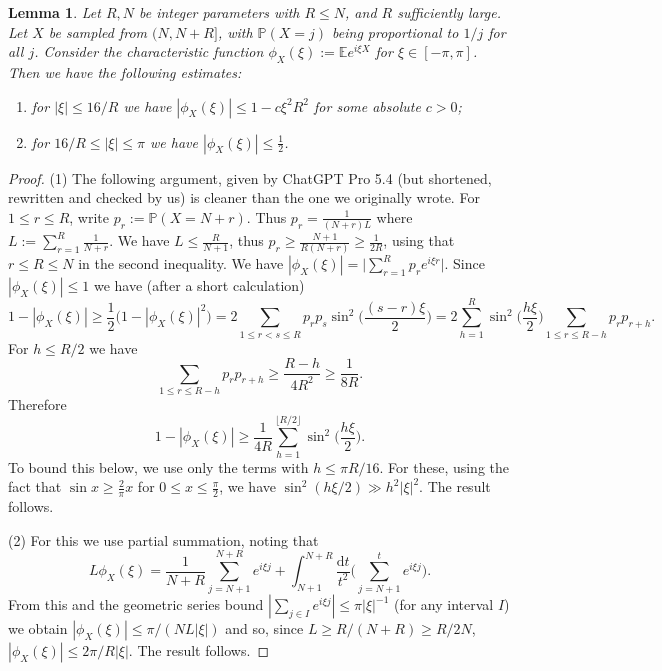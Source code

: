 \documentclass[11pt,reqno]{amsart}
\numberwithin{equation}{section}
\newtheorem{lemma}[theorem]{Lemma}
\theoremstyle{definition}
\theoremstyle{remark}
\newcommand{\mb}{\mathbb}
\renewcommand{\le}{\leqslant}
\renewcommand{\ge}{\geqslant}
\begin{document}
\begin{lemma}\label{a1-lem}
Let $R, N$ be integer parameters with $R \le N$, and $R$ sufficiently large. Let $X$ be sampled from $(N,  N+R]$, with $\mb{P}(X = j)$ being proportional to $1/j$ for all $j$. Consider the characteristic function $\phi_X(\xi) := \mb{E} e^{i \xi X}$ for $\xi \in [-\pi, \pi]$. Then we have the following estimates:
\begin{enumerate}
\item for $|\xi| \le 16/R$ we have $|\phi_X(\xi)| \le 1 - c\xi^2 R^2$ for some absolute $c > 0$;
\item for $16/R \le |\xi| \le \pi$ we have $|\phi_X(\xi)| \le \frac{1}{2}$.
\end{enumerate}    
\end{lemma}
\begin{proof} (1) The following argument, given by ChatGPT Pro 5.4 (but shortened, rewritten and checked by us) is cleaner than the one we originally wrote. For $1\le r \le R$, write $p_r := \mb{P}(X = N + r)$. Thus $p_r = \frac{1}{(N + r)L}$ where $L :=  \sum_{r = 1}^R \frac{1}{N + r}$. We have $L \le \frac{R}{N + 1}$, thus $ p_r \ge \frac{N+1}{R(N + r)} \ge \frac{1}{2R}$, using that $r \le R \le N$ in the second inequality.
We have $|\phi_X(\xi)| = \big| \sum_{r = 1}^R p_r e^{i \xi r}\big|$. Since $|\phi_X(\xi)| \le 1$ we have (after a short calculation)
\[ 1 - |\phi_X(\xi)| \ge \frac{1}{2}\big(1 - |\phi_X(\xi)|^2\big) = 2 \sum_{1 \le r < s \le R} p_r p_s \sin^2 \big(\frac{(s - r)\xi}{2}\big) = 2\sum_{h = 1}^R \sin^2 \big(\frac{h\xi}{2}\big)\sum_{1 \le r \le R - h} p_r p_{r + h} .\]
For $h \le R/2$ we have
\[ \sum_{1 \le r \le R - h} p_r p_{r + h} \ge \frac{R - h}{4R^2} \ge \frac{1}{8R}.\]
Therefore
\[ 1 - |\phi_X(\xi)| \ge \frac{1}{4R} \sum_{h = 1}^{\lfloor R/2\rfloor} \sin^2 \big(\frac{h\xi}{2}\big).\]
To bound this below, we use only the terms with $h \le \pi R/16$. For these, using the fact that $\sin x \ge \frac{2}{\pi} x$ for $0 \le x \le \frac{\pi}{2}$, we have $\sin^2(h\xi/2) \gg h^2|\xi|^2$. The result follows. 

(2) For this we use partial summation, noting that
\begin{equation*} L \phi_X(\xi) = \frac{1}{N+R} \sum_{j = N+1}^{N+R} e^{i \xi j} + \int^{N+R}_{N+1} \frac{\mathrm{d}t}{t^2} \Big( \sum_{j = N+1}^t e^{ i \xi j} \Big).\end{equation*}
From this and the geometric series bound $|\sum_{j \in I} e^{i\xi j}| \le \pi |\xi|^{-1}$ (for any interval $I$) we obtain $|\phi_X(\xi)| \le \pi/(N L|\xi|)$ and so, since $L \ge R/(N+R) \ge R/2N$, $|\phi_X(\xi)| \le 2\pi/R|\xi|$. The result follows.
    \end{proof}
\end{document}
